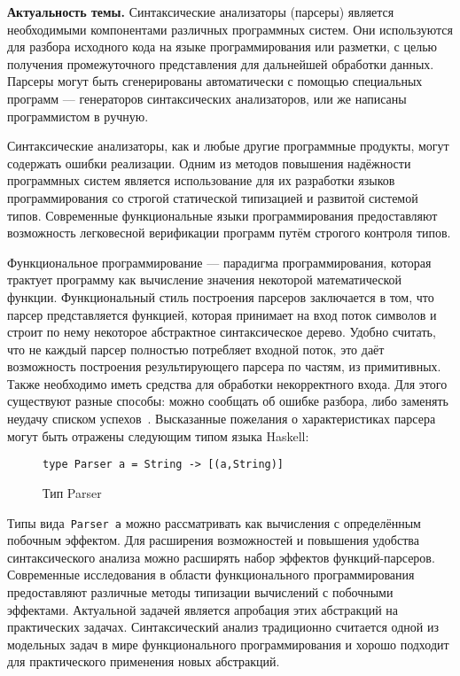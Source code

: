 \Intro

\textbf{Актуальность темы.} Синтаксические анализаторы (парсеры) является необходимыми  
компонентами различных программных систем. Они используются для разбора исходного 
кода на языке программирования или разметки, с целью получения промежуточного 
представления для дальнейшей обработки данных. Парсеры могут быть сгенерированы 
автоматически с помощью специальных программ --- генераторов синтаксических 
анализаторов, или же написаны программистом в ручную. 

Синтаксические анализаторы, как и любые другие программные продукты, могут 
содержать ошибки реализации. Одним из методов повышения надёжности программных 
систем является использование для их разработки языков программирования со 
строгой статической типизацией и развитой системой типов. Современные функциональные 
языки программирования предоставляют возможность легковесной верификации программ
путём строгого контроля типов. 

Функциональное программирование --- парадигма программирования, которая трактует
программу как вычисление значения некоторой математической функции. 
Функциональный стиль построения парсеров заключается в том, что парсер
представляется функцией, которая принимает на вход поток символов и строит
по нему некоторое абстрактное синтаксическое дерево. Удобно считать, что не каждый
парсер полностью потребляет входной поток, это даёт возможность
построения результирующего парсера по частям, из примитивных. Также необходимо
иметь средства для обработки некорректного входа. Для этого существуют разные
способы: можно сообщать об ошибке разбора, либо заменять неудачу списком
успехов~\cite{wadlerSuccess}. Высказанные пожелания о характеристиках
парсера могут быть отражены следующим типом языка Haskell:

\begin{figure}[h]
\begin{lstlisting}
type Parser a = String -> [(a,String)]
\end{lstlisting}
\caption{Тип Parser}
\end{figure}

Типы вида~\lstinline{Parser a} можно рассматривать как вычисления с определённым 
побочным эффектом. Для расширения возможностей и повышения удобства синтаксического 
анализа можно расширять набор эффектов функций-парсеров.    
Современные исследования в области функционального программирования предоставляют
различные методы типизации вычислений с побочными эффектами. 
Актуальной задачей является апробация этих абстракций на практических
задачах. Синтаксический анализ традиционно считается одной из модельных
задач в мире функционального программирования и хорошо подходит для практического
применения новых абстракций.

